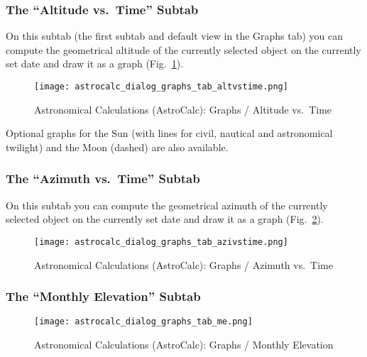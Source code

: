 \subsubsection{The ``Altitude vs.\ Time'' Subtab}
\label{sec:gui:AstroCalc:Graphs:AltVsTime}
  
On this subtab (the first subtab and default view in the Graphs tab) you can compute the geometrical altitude of the currently selected object 
on the currently set date and draw it as a graph (Fig.~\ref{fig:gui:AstroCalc:Graphs:AltVsTime}).
    
\begin{figure}[htbp]
\centering\texttt{[image: astrocalc\_dialog\_graphs\_tab\_altvstime.png]}
\caption{Astronomical Calculations (AstroCalc): Graphs / Altitude vs.\ Time}
\label{fig:gui:AstroCalc:Graphs:AltVsTime}
\end{figure}

Optional graphs for the Sun (with lines for civil, nautical and astronomical twilight) and the Moon (dashed) are also available.

\newpage 
\subsubsection{The ``Azimuth vs.\ Time'' Subtab}
\label{sec:gui:AstroCalc:Graphs:AziVsTime}
  
On this subtab  you can compute the geometrical azimuth of the currently selected object 
on the currently set date and draw it as a graph (Fig.~\ref{fig:gui:AstroCalc:Graphs:AziVsTime}).
    
\begin{figure}[htbp]
\centering\texttt{[image: astrocalc\_dialog\_graphs\_tab\_azivstime.png]}
\caption{Astronomical Calculations (AstroCalc): Graphs / Azimuth vs.\ Time}
\label{fig:gui:AstroCalc:Graphs:AziVsTime}
\end{figure}

\subsubsection{The ``Monthly Elevation'' Subtab}
\label{sec:gui:AstroCalc:Graphs:ME}

\begin{figure}[htbp]
\centering\texttt{[image: astrocalc\_dialog\_graphs\_tab\_me.png]}
\caption{Astronomical Calculations (AstroCalc): Graphs / Monthly Elevation}
\label{fig:gui:AstroCalc:Graphs:ME}
\end{figure}

